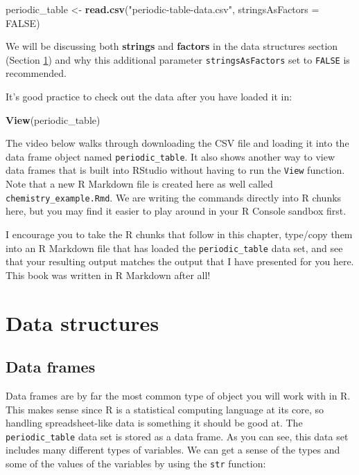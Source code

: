\documentclass[]{tufte-book}
\newenvironment{Shaded}{\begin{snugshade}}{\end{snugshade}}
\newcommand{\DataTypeTok}[1]{\textcolor[rgb]{0.13,0.29,0.53}{#1}}
\newcommand{\KeywordTok}[1]{\textcolor[rgb]{0.13,0.29,0.53}{\textbf{#1}}}
\newcommand{\NormalTok}[1]{#1}
\newcommand{\OtherTok}[1]{\textcolor[rgb]{0.56,0.35,0.01}{#1}}
\newcommand{\StringTok}[1]{\textcolor[rgb]{0.31,0.60,0.02}{#1}}
\begin{document}
\begin{Shaded}
\begin{Highlighting}[]
\NormalTok{periodic_table <-}\StringTok{ }\KeywordTok{read.csv}\NormalTok{(}\StringTok{"periodic-table-data.csv"}\NormalTok{,}
              \DataTypeTok{stringsAsFactors =} \OtherTok{FALSE}\NormalTok{)}
\end{Highlighting}
\end{Shaded}

We will be discussing both \textbf{strings} and \textbf{factors} in the data structures section (Section \ref{data-structures}) and why this additional parameter \texttt{stringsAsFactors} set to \texttt{FALSE} is recommended.

It's good practice to check out the data after you have loaded it in:

\begin{Shaded}
\begin{Highlighting}[]
\KeywordTok{View}\NormalTok{(periodic_table)}
\end{Highlighting}
\end{Shaded}

The video below walks through downloading the CSV file and loading it into the data frame object named \texttt{periodic\_table}. It also shows another way to view data frames that is built into RStudio without having to run the \texttt{View} function. Note that a new R Markdown file is created here as well called \texttt{chemistry\_example.Rmd}. We are writing the commands directly into R chunks here, but you may find it easier to play around in your R Console sandbox first.

I encourage you to take the R chunks that follow in this chapter, type/copy them into an R Markdown file that has loaded the \texttt{periodic\_table} data set, and see that your resulting output matches the output that I have presented for you here. This book was written in R Markdown after all!

\hypertarget{data-structures}{%
\section{Data structures}\label{data-structures}}

\hypertarget{data-frames}{%
\subsection{Data frames}\label{data-frames}}

Data frames are by far the most common type of object you will work with in R. This makes sense since R is a statistical computing language at its core, so handling spreadsheet-like data is something it should be good at. The \texttt{periodic\_table} data set is stored as a data frame. As you can see, this data set includes many different types of variables. We can get a sense of the types and some of the values of the variables by using the \texttt{str} function:
\end{document}
